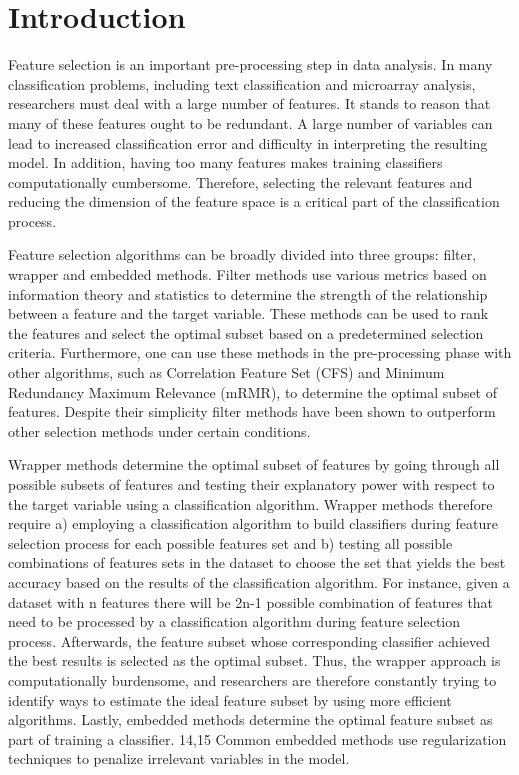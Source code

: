 \documentclass[review]{elsarticle}
\begin{document}
\linenumbers


\section{Introduction}


Feature selection is an important pre-processing step in data analysis.\cite{Abdelhamid2017, Chandrashekar2014} In many classification problems, including text classification and microarray analysis, researchers must deal with a large number of features. It stands to reason that many of these features ought to be redundant. A large number of variables can lead to increased classification error and difficulty in interpreting the resulting model. In addition, having too many features makes training classifiers computationally cumbersome.\cite{Bunker2019} Therefore, selecting the relevant features and reducing the dimension of the feature space is a critical part of the classification process. 

Feature selection algorithms can be broadly divided into three groups: filter, wrapper and embedded methods.\cite{McCluskey2014} Filter methods use various metrics based on information theory and statistics to determine the strength of the relationship between a feature and the target variable.\cite{Kamalov2017} These methods can be used to rank the features and select the optimal subset based on a predetermined selection criteria. Furthermore, one can use these methods in the pre-processing phase with other algorithms, such as Correlation Feature Set (CFS) and Minimum Redundancy Maximum Relevance (mRMR), to determine the optimal subset of features.\cite{Hall1999, HanchuanPeng2005} Despite their simplicity filter methods have been shown to outperform other selection methods under certain conditions. 


Wrapper methods determine the optimal subset of features by going through all possible subsets of features and testing their explanatory power with respect to the target variable using a classification algorithm.\cite{Hall1999}  Wrapper methods therefore require a) employing a classification algorithm to build classifiers during feature selection process for each possible features set and b) testing all possible combinations of features sets in the dataset to choose the set that yields the best accuracy based on the results of the classification algorithm. \cite{Li2017}  For instance, given a dataset with n features there will be 2n-1 possible combination of features that need to be processed by a classification algorithm during feature selection process. Afterwards, the feature subset whose corresponding classifier achieved the best results is selected as the optimal subset. Thus, the wrapper approach is computationally burdensome, and researchers are therefore constantly trying to identify ways to estimate the ideal feature subset by using more efficient algorithms.\cite{Hoque2014,Zhou2016,Thabtah2016} Lastly, embedded methods determine the optimal feature subset as part of training a classifier. \cite{Al-Thubaity2013, Azhagusundari2013} 14,15 Common embedded methods use regularization techniques to penalize irrelevant variables in the model.
\end{document}
